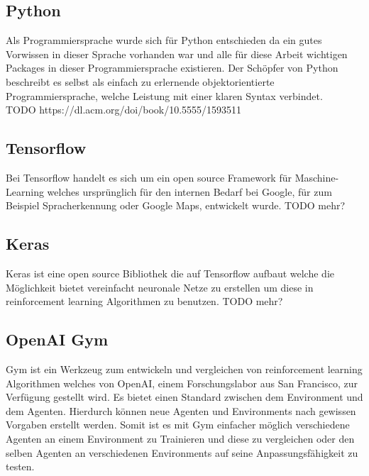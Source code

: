 \subsection{Python}
Als Programmiersprache wurde sich für Python entschieden da ein gutes Vorwissen in dieser Sprache vorhanden war und alle für diese Arbeit wichtigen Packages in dieser Programmiersprache existieren.
Der Schöpfer von Python beschreibt es selbst als einfach zu erlernende objektorientierte Programmiersprache, welche Leistung mit einer klaren Syntax verbindet.\\
\colorbox{red!30}{TODO https://dl.acm.org/doi/book/10.5555/1593511}

\subsection{Tensorflow}
Bei Tensorflow handelt es sich um ein open source Framework für Maschine-Learning welches ursprünglich für den internen Bedarf bei Google, für zum Beispiel Spracherkennung oder Google Maps, entwickelt wurde. 
\colorbox{red!30}{TODO mehr?}

\subsection{Keras}
Keras ist eine open source Bibliothek die auf Tensorflow aufbaut welche die Möglichkeit bietet vereinfacht neuronale Netze zu erstellen um diese in reinforcement learning Algorithmen zu benutzen.
\colorbox{red!30}{TODO mehr?}

\subsection{OpenAI Gym}
Gym ist ein Werkzeug zum entwickeln und vergleichen von reinforcement learning Algorithmen welches von OpenAI, einem Forschungslabor aus San Francisco, zur Verfügung gestellt wird. Es bietet einen Standard zwischen dem Environment und dem Agenten. Hierdurch können neue Agenten und Environments nach gewissen Vorgaben erstellt werden. Somit ist es mit Gym einfacher möglich verschiedene Agenten an einem Environment zu Trainieren und diese zu vergleichen oder den selben Agenten an verschiedenen Environments auf seine Anpassungsfähigkeit zu testen.

